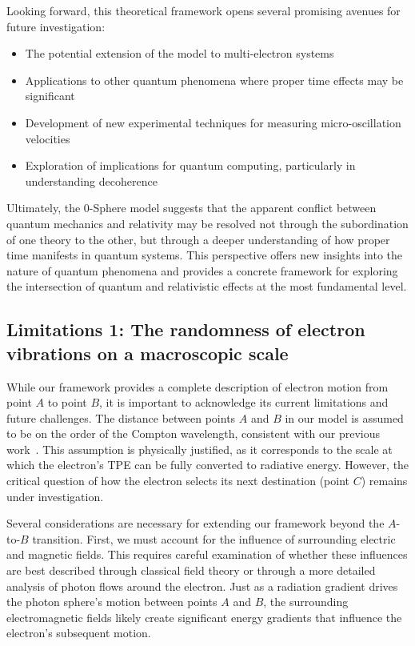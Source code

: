 \documentclass[%
 reprint,
 amsmath,amssymb,
 aps,
]{revtex4-1}
\numberwithin{equation}{section}%
\begin{document}
Looking forward, this theoretical framework opens several promising avenues for future investigation:

\begin{itemize}
    \item The potential extension of the model to multi-electron systems
    \item Applications to other quantum phenomena where proper time effects may be significant
    \item Development of new experimental techniques for measuring micro-oscillation velocities
    \item Exploration of implications for quantum computing, particularly in understanding decoherence
\end{itemize}

Ultimately, the 0-Sphere model suggests that the apparent conflict between quantum mechanics and relativity may be resolved not through the subordination of one theory to the other, but through a deeper understanding of how proper time manifests in quantum systems. This perspective offers new insights into the nature of quantum phenomena and provides a concrete framework for exploring the intersection of quantum and relativistic effects at the most fundamental level.

\subsection{\label{sec:Limitation 1}Limitations 1: The randomness of electron vibrations on a macroscopic scale}

While our framework provides a complete description of electron motion from point $A$ to point $B$, it is important to acknowledge its current limitations and future challenges. The distance between points $A$ and $B$ in our model is assumed to be on the order of the Compton wavelength, consistent with our previous work~\cite{hanamura2018}. This assumption is physically justified, as it corresponds to the scale at which the electron's TPE can be fully converted to radiative energy. However, the critical question of how the electron selects its next destination (point $C$) remains under investigation.

Several considerations are necessary for extending our framework beyond the $A$-to-$B$ transition. First, we must account for the influence of surrounding electric and magnetic fields. This requires careful examination of whether these influences are best described through classical field theory or through a more detailed analysis of photon flows around the electron. Just as a radiation gradient drives the photon sphere's motion between points $A$ and $B$, the surrounding electromagnetic fields likely create significant energy gradients that influence the electron's subsequent motion.
\end{document}
